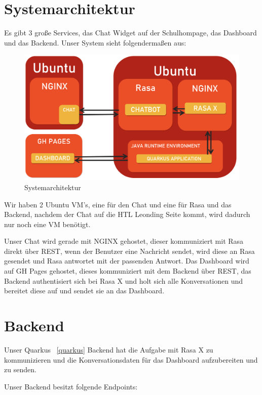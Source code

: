 \section{Systemarchitektur}

Es gibt 3 große Services, das Chat Widget auf der Schulhompage, das Dashboard und das Backend.
Unser System sieht folgendermaßen aus:

\begin{figure}[hbt!]
    \centering
    \includegraphics[scale=0.2]{pics/systemarchitektur}
    \caption{Systemarchitektur}
    \label{fig:impl:architektur}
\end{figure}

Wir haben 2 Ubuntu VM's, eine für den Chat und eine für Rasa und das Backend, nachdem der Chat auf die HTL Leonding Seite kommt, wird dadurch nur noch eine VM benötigt.

Unser Chat wird gerade mit NGINX gehostet, dieser kommuniziert mit Rasa direkt über REST, wenn der Benutzer eine Nachricht sendet, wird diese an Rasa gesendet und Rasa antwortet mit der passenden Antwort.
Das Dashboard wird auf GH Pages gehostet, dieses kommuniziert mit dem Backend über REST, das Backend authentisiert sich bei Rasa X und holt sich alle Konversationen und bereitet diese auf und sendet sie an das Dashboard.

\section{Backend}\label{sec:backend}

Unser Quarkus ~\ref{quarkus} Backend hat die Aufgabe mit Rasa X zu kommunizieren und die Konversationsdaten für das Dashboard aufzubereiten und zu senden.

Unser Backend besitzt folgende Endpoints:

